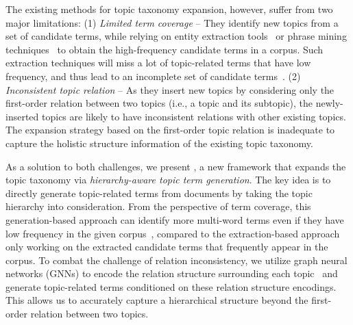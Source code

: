 The existing methods for topic taxonomy expansion, however, suffer from two major limitations:
(1) \textit{Limited term coverage} --
They identify new topics from a set of candidate terms, while relying on entity extraction tools~\cite{zeng2020tri} or phrase mining techniques~\cite{liu2015mining,shang2018automated,gu2021ucphrase} to obtain the high-frequency candidate terms in a corpus.
Such extraction techniques will miss a lot of topic-related terms that have low frequency, and thus lead to an incomplete set of candidate terms~\cite{zeng2021enhancing}.
(2) \textit{Inconsistent topic relation} --
As they insert new topics by considering only the first-order relation between two topics (i.e., a topic and its subtopic), the newly-inserted topics are likely to have inconsistent relations with other existing topics.
The expansion strategy based on the first-order topic relation is inadequate to capture the holistic structure information of the existing topic taxonomy.

As a solution to both challenges, we present \proposed, a new framework that expands the topic taxonomy via \textit{hierarchy-aware topic term generation}.
The key idea is to directly generate topic-related terms from documents by taking the topic hierarchy into consideration.
From the perspective of term coverage, this generation-based approach can identify more multi-word terms even if they have low frequency in the given corpus~\cite{zeng2021enhancing}, compared to the extraction-based approach only working on the extracted candidate terms that frequently appear in the corpus.
To combat the challenge of relation inconsistency, we utilize graph neural networks (GNNs) to encode the relation structure surrounding each topic~\cite{kipf2017semi, shen2021taxoclass} and generate topic-related terms conditioned on these relation structure encodings.
This allows us to accurately capture a hierarchical structure beyond the first-order relation between two topics.

